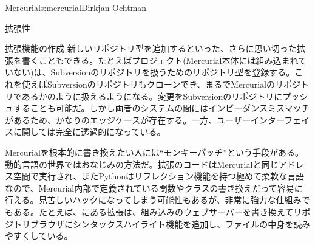 \begin{aosachapter}{Mercurial}{s:mercurial}{Dirkjan Ochtman}
\begin{aosasect1}{拡張性}
\begin{aosasect2}{拡張機能の作成}
新しいリポジトリ型を追加するといった、さらに思い切った拡張を書くこともできる。たとえばプロジェクト(Mercurial本体には組み込まれていない)は、Subversionのリポジトリを扱うためのリポジトリ型を登録する。これを使えばSubversionのリポジトリもクローンでき、まるでMercurialのリポジトリであるかのように扱えるようになる。変更をSubversionのリポジトリにプッシュすることも可能だ。しかし両者のシステムの間にはインピーダンスミスマッチがあるため、かなりのエッジケースが存在する。一方、ユーザーインターフェイスに関しては完全に透過的になっている。

Mercurialを根本的に書き換えたい人には``モンキーパッチ''という手段がある。動的言語の世界ではおなじみの方法だ。拡張のコードはMercurialと同じアドレス空間で実行され、またPythonはリフレクション機能を持つ極めて柔軟な言語なので、Mercurial内部で定義されている関数やクラスの書き換えだって容易に行える。見苦しいハックになってしまう可能性もあるが、非常に強力な仕組みでもある。たとえば、にある拡張は、組み込みのウェブサーバーを書き換えてリポジトリブラウザにシンタックスハイライト機能を追加し、ファイルの中身を読みやすくしている。


\end{aosasect2}
\end{aosasect1}
\end{aosachapter}
